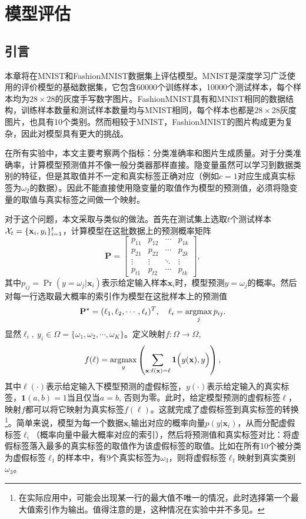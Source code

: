\chapter{模型评估}\label{chap:experiments}

\section{引言}\label{sec:map-to-real}
本章将在MNIST\citep{lecun1989backpropagation}和FashionMNIST\citep{xiao2017/online}数据集上评估模型。MNIST是深度学习广泛使用的评价模型的基础数据集，它包含60000个训练样本，10000个测试样本，每个样本均为$28\times 28$的灰度手写数字图片。FashionMNIST具有和MNIST相同的数据结构，训练样本数量和测试样本数量均与MNIST相同，每个样本也都是$28\times 28$灰度图片，也具有10个类别。然而相较于MNIST，FashionMNIST的图片构成更为复杂，因此对模型具有更大的挑战。

在所有实验中，本文主要考察两个指标：分类准确率和图片生成质量。对于分类准确率，计算模型预测值并不像一般分类器那样直接。隐变量虽然可以学习到数据类别的特征，但是其取值并不一定和真实标签正确对应（例如$c=1$对应生成真实标签为$\omega_2$的数据）。因此不能直接使用隐变量的取值作为模型的预测值，必须将隐变量的取值与真实标签之间做一个映射。

对于这个问题，本文采取与\citet{springenberg2015unsupervised}类似的做法。首先在测试集上选取$t$个测试样本$\mathcal{X}_t = \{\mathbf{x}_i, y_i\}_{i=1}^t$，计算模型在这批数据上的预测概率矩阵
\[
  \mathbf{P} = 
\begin{bmatrix}
  p_{11} & p_{12} & \cdots & p_{1k} \\
  p_{21} & p_{22} & \cdots & p_{2k} \\
  \vdots & \vdots & \ddots & \vdots \\
  p_{t1} & p_{t2} & \cdots & p_{tk}
\end{bmatrix},
\]
其中$p_{ij} = \Pr(y=\omega_j | \mathbf{x}_i)$表示给定输入样本$\mathbf{x}_i$时，模型预测$y = \omega_j$的概率。然后对每一行选取最大概率的索引作为模型在这批样本上的预测值
\[
  \mathbf{P}^{\star} = (\ell_1, \ell_2, \cdots, \ell_t)^T, \quad \ell_i = \mathop{\text{argmax}}_j p_{ij}.
\]
显然$\ell_i, ~y_i \in \Omega = \{\omega_1, \omega_2, \cdots, \omega_K\}$。定义映射$f: \Omega \to \Omega$,
\[
  f(\ell) = \mathop{\text{argmax}}_y \left( 
    \sum_{\mathbf{x}: \ell(\mathbf{x}) = \ell} \mathbf{1}\Big(y(\mathbf{x}), y\Big) 
  \right),
\]
其中$\ell(\cdot)$表示给定输入下模型预测的虚假标签，$y(\cdot)$表示给定输入的真实标签，$\mathbf{1}(a, b) = 1$当且仅当$a = b$, 否则为零。此时，给定模型预测的虚假标签$\ell$，映射$f$都可以将它映射为真实标签$f(\ell)$。这就完成了虚假标签到真实标签的转换\footnote{在实际应用中，可能会出现某一行的最大值不唯一的情况，此时选择第一个最大值索引作为输出。值得注意的是，这种情况在实验中并不多见。}。简单来说，模型为每一个数据$\mathbf{x}_i$输出对应的概率向量$p(y|\mathbf{x}_i)$，从而分配虚假标签$\ell_i$（概率向量中最大概率对应的索引），然后将预测值和真实标签对比：将虚假标签落入最多的真实标签的取值作为该虚假标签的取值。比如在所有10个被分类为虚假标签$\ell_1$的样本中，有9个真实标签为$\omega_3$，则将虚假标签$\ell_1$映射到真实类别$\omega_3$。

